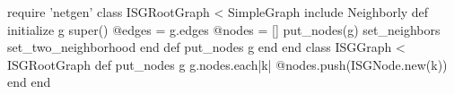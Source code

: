 \begin{rubyblock}
require 'netgen'
class ISGRootGraph < SimpleGraph
  include Neighborly
  def initialize g
    super()
    @edges = g.edges
    @nodes = []
    put_nodes(g)
    set_neighbors
    set_two_neighborhood
  end
  def put_nodes g
  end
end
class ISGGraph < ISGRootGraph
  def put_nodes g
    g.nodes.each{|k| @nodes.push(ISGNode.new(k))}
  end
end
\end{rubyblock}
